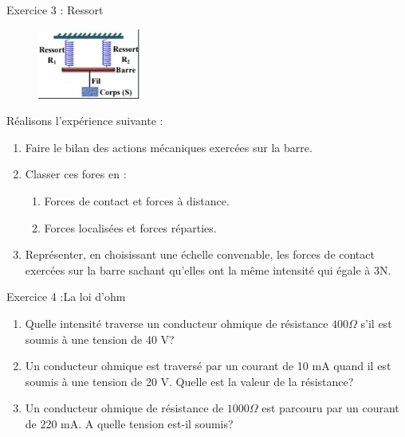 \documentclass[12pt, french]{article}
\begin{document}

\begin{Box2}{Exercice 3 : Ressort }
	\begin{figure}
    \includegraphics[width=0.3\textwidth]{./img/Ressort.png}
  \caption{}
	\end{figure}
Réalisons l’expérience suivante :
\begin{enumerate}
	\item Faire le bilan des actions
mécaniques exercées sur la
barre.
\item Classer ces fores en : 
	\begin{enumerate}
		\item Forces de contact et forces à distance.
		\item Forces localisées et forces réparties.

	\end{enumerate}
\item Représenter, en choisissant une échelle
convenable, les forces de contact exercées sur la
barre sachant qu’elles ont la même intensité qui
égale à 3N.
\end{enumerate}
\end{Box2}


   \begin{Box2}{Exercice 4 :La loi d’ohm} 
	   \begin{enumerate}
   \item Quelle intensité traverse un conducteur ohmique de résistance $400\Omega$ s’il est soumis à
une tension de 40 V?
\item Un conducteur ohmique est traversé par un courant de 10 mA quand il est soumis à
une tension de 20 V. Quelle est la valeur de la résistance?
\item Un conducteur ohmique de résistance de $1000\Omega$ est parcouru par un courant de
220 mA. A quelle tension est-il soumis?
\end{enumerate}
   \end{Box2}
\end{document}
